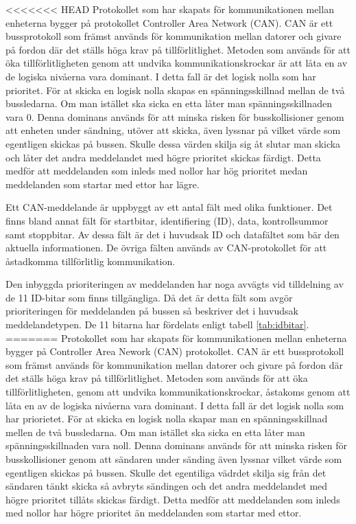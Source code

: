 <<<<<<< HEAD
Protokollet som har skapats för kommunikationen mellan enheterna bygger på protokollet Controller Area Network (CAN). CAN är ett bussprotokoll som främst används för kommunikation mellan datorer och givare på fordon där det ställs höga krav på tillförlitlighet. Metoden som används för att öka tillförlitligheten genom att undvika kommunikationskrockar är att låta en av de logiska nivåerna vara dominant. I detta fall är det logisk nolla som har prioritet. För at skicka en logisk nolla skapas en spänningsskillnad mellan de två bussledarna. Om man istället ska sicka en etta låter man spänningsskillnaden vara 0. Denna dominans används för att minska risken för busskollisioner genom att enheten under sändning, utöver att skicka, även lyssnar på vilket värde som egentligen skickas på bussen. Skulle dessa värden skilja sig åt slutar man skicka och låter det andra meddelandet med högre prioritet skickas färdigt. Detta medför att meddelanden som inleds med nollor har hög prioritet medan meddelanden som startar med ettor har lägre.

Ett CAN-meddelande är uppbyggt av ett antal fält med olika funktioner. Det finns bland annat fält för startbitar, identifiering (ID), data, kontrollsummor samt stoppbitar. Av dessa fält är det i huvudsak ID och datafältet som bär den aktuella informationen. De övriga fälten används av CAN-protokollet för att åstadkomma tillförlitlig kommunikation.

Den inbyggda prioriteringen av meddelanden har noga avvägts vid tilldelning av de 11 ID-bitar som finns tillgängliga. Då det är detta fält som avgör prioriteringen för meddelanden på bussen så beskriver det i huvudsak meddelandetypen. De 11 bitarna har fördelats enligt tabell \ref{tab:idbitar}.
=======
Protokollet som har skapats för kommunikationen mellan enheterna bygger på Controller Area Nework (CAN) protokollet.
CAN är ett bussprotokoll som främst används för kommunikation mellan datorer och givare på fordon där det ställs höga krav på tillförlitlighet. Metoden som används för att öka tillförlitligheten, genom att undvika kommunikationskrockar, åstakoms genom att låta en av de logiska nivåerna vara dominant. I detta fall är det logisk nolla som har priorietet.
För at skicka en logisk nolla skapar man en spänningsskillnad mellen de två bussledarna.
Om man istället ska sicka en etta låter man spänningsskillnaden vara noll.
Denna dominans används för att minska risken för busskollisioner genom att sändaren under sänding även lyssnar vilket värde som egentligen skickas på bussen.
Skulle det egentiliga vädrdet skilja sig från det sändaren tänkt skicka så avbryts sändingen och det andra meddelandet med högre prioritet tillåts skickas färdigt.
Detta medför att meddelanden som inleds med nollor har högre prioritet än meddelanden som startar med ettor.

